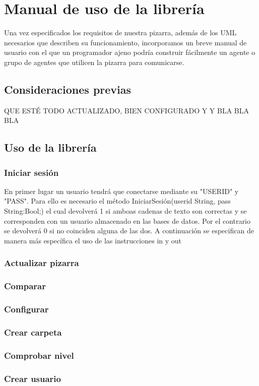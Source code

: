 \chapter{Manual de uso de la librería}
Una vez especificados los requisitos de nuestra pizarra, además de los UML necesarios que describen su funcionamiento, incorporamos un breve manual de usuario con el que un programador ajeno podría construir fácilmente un agente o grupo de agentes que utilicen la pizarra para comunicarse.

\section{Consideraciones previas}
\color{red}QUE ESTÉ TODO ACTUALIZADO, BIEN CONFIGURADO Y Y BLA BLA BLA
\color{black}
\section{Uso de la librería}
\subsection{Iniciar sesión}
En primer lugar un usuario tendrá que conectarse mediante su "USERID" y "PASS". Para ello es necesario el método IniciarSesión(userid String, pass String:Bool;) el cual devolverá 1 si amboas cadenas de texto son correctas y se corresponden con un usuario almacenado en las bases de datos. Por el contrario se devolverá 0 si no coinciden alguna de las dos.
A continuación se especifican de manera más específica el uso de las instrucciones in y out
\subsection{Actualizar pizarra}
\subsection{Comparar}
\subsection{Configurar}
\subsection{Crear carpeta}
\subsection{Comprobar nivel}
\subsection{Crear usuario}
